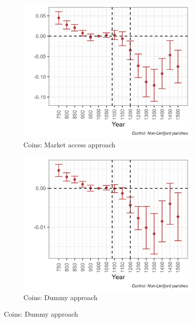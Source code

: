 \begin{figure}
    \centering
    \caption{Archaelogical results (full sample)}
    \begin{subfigure}[b]{0.45\textwidth}
        \centering
        \caption{Coins: Market access approach} \label{fig:arch1a_norm}
        \includegraphics[width=\textwidth]{Plots/Regression_plots/arch_MA_coins_norm.png}
    \end{subfigure}
    \hfill
    \begin{subfigure}[b]{0.45\textwidth}
        \centering
        \caption{Coins: Dummy approach} \label{fig:arch1b_norm}
        \includegraphics[width=\textwidth]{Plots/Regression_plots/arch_dummy_coins_norm.png}

\end{subfigure}
\end{figure}
